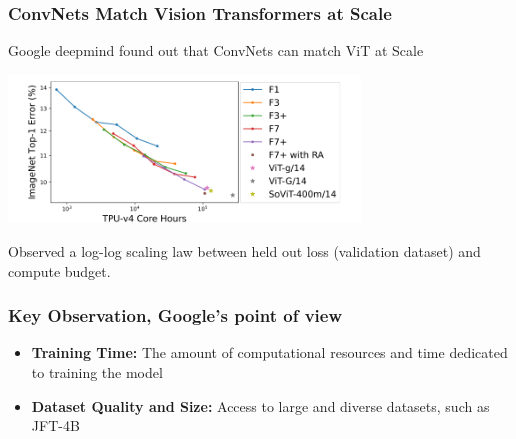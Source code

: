 \begin{frame}
\frametitle{ConvNets Match Vision Transformers at Scale}
Google deepmind found out that ConvNets can match ViT at Scale

\vspace{0.5 cm}

\begin{center}
    \includegraphics[width=0.7\textwidth]{img/3-section/log-log.png} 
\end{center}

Observed a log-log scaling law between held out loss (validation dataset) and compute budget.
\end{frame}

\begin{frame}
\frametitle{Key Observation, Google's point of view}

\vspace{0.5cm}
\begin{itemize}
    \item \textbf{Training Time:} The amount of computational resources and time dedicated to training the model
    \item \textbf{Dataset Quality and Size:} Access to large and diverse datasets, such as JFT-4B
\end{itemize}

\end{frame}


